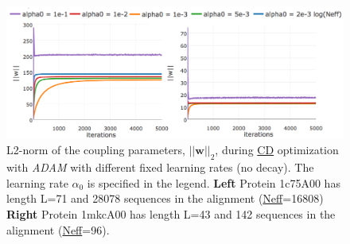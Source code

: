 \documentclass[11pt,a4paper,twoside]{book}
\newcommand{\w}{\mathbf{w}}
\theoremstyle{definition}
\theoremstyle{definition}
\theoremstyle{remark}
\begin{document}
\begin{figure}

{\centering \includegraphics[width=1\linewidth]{img/full_likelihood/adam/parameter_norms_1c75A00_1mkcA00_learningrates} 

}

\caption{L2-norm of the coupling parameters,
\(||\w||_2\), during \protect\hyperlink{abbrev}{CD} optimization with
\emph{ADAM} with different fixed learning rates (no decay). The learning
rate \(\alpha_0\) is specified in the legend. \textbf{Left} Protein
1c75A00 has length L=71 and 28078 sequences in the alignment
(\protect\hyperlink{abbrev}{Neff}=16808) \textbf{Right} Protein 1mkcA00
has length L=43 and 142 sequences in the alignment
(\protect\hyperlink{abbrev}{Neff}=96).}\label{fig:adam-learning-rate}
\end{figure}
\end{document}
